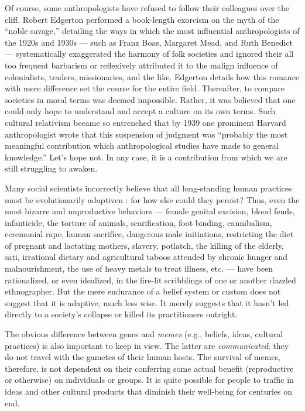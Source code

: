 \documentclass[a4paper,12pt]{extbook}
\begin{document}
Of course, some anthropologists have refused to follow their colleagues over the cliff. 
Robert Edgerton performed a book-length exorcism on the myth of the ``noble savage,'' detailing the ways in which the most influential anthropologists of the 1920s and 1930s --- such as Franz Boas, Margaret Mead, and Ruth Benedict --- systematically exaggerated the harmony of folk societies and ignored their all too frequent barbarism or reflexively attributed it to the malign influence of colonialists, traders, missionaries, and the like. 
Edgerton details how this romance with mere difference set the course for the entire field. 
Thereafter, to compare societies in moral terms was deemed impossible. 
Rather, it was believed that one could only hope to understand and accept a culture on its own terms. 
Such cultural relativism became so entrenched that by 1939 one prominent Harvard anthropologist wrote that this suspension of judgment was ``probably the most meaningful contribution which anthropological studies have made to general knowledge.'' 
Let’s hope not. 
In any case, it is a contribution from which we are still struggling to awaken. 

Many social scientists incorrectly believe that all long-standing human practices must be evolutionarily adaptiven : 
for how else could they persist? 
Thus, even the most bizarre and unproductive behaviors --- female genital excision, blood feuds, infanticide, the torture of animals, scarification, foot binding, cannibalism, ceremonial rape, human sacrifice, dangerous male initiations, restricting the diet of pregnant and lactating mothers, slavery, potlatch, the killing of the elderly, sati, irrational dietary and agricultural taboos attended by chronic hunger and malnourishment, the use of heavy metals to treat illness, etc. --- have been rationalized, or even idealized, in the fire-lit scribblings of one or another dazzled ethnographer. 
But the mere endurance of a belief system or custom does not suggest that it is adaptive, much less wise. 
It merely suggests that it hasn’t led directly to a society’s collapse or killed its practitioners outright. 

The obvious difference between genes and \textit{memes} (e.g., beliefs, ideas, cultural practices) is also important to keep in view. 
The latter are \textit{communicated}; 
they do not travel with the gametes of their human hosts. 
The survival of memes, therefore, is not dependent on their conferring some actual benefit (reproductive or otherwise) on individuals or groups. 
It is quite possible for people to traffic in ideas and other cultural products that diminish their well-being for centuries on end. 
\end{document}
